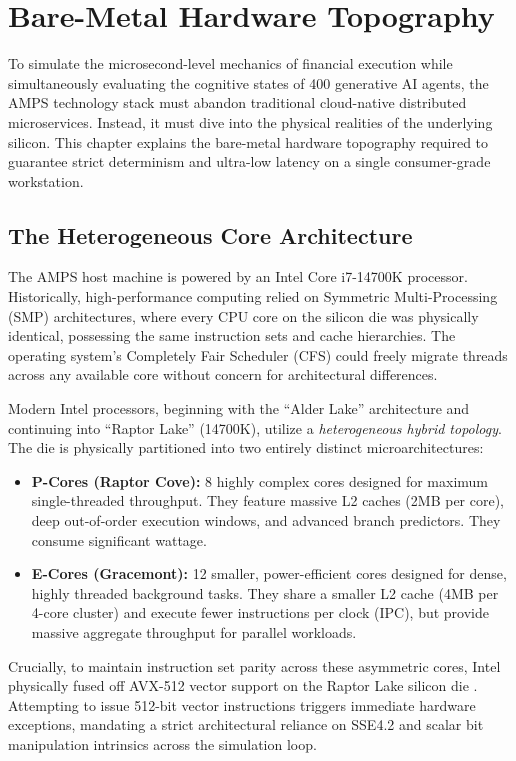 \chapter{Bare-Metal Hardware Topography}
\label{ch:hardware_topography}

To simulate the microsecond-level mechanics of financial execution while simultaneously evaluating the cognitive states of 400 generative AI agents, the AMPS technology stack must abandon traditional cloud-native distributed microservices. Instead, it must dive into the physical realities of the underlying silicon. This chapter explains the bare-metal hardware topography required to guarantee strict determinism and ultra-low latency on a single consumer-grade workstation.

\section{The Heterogeneous Core Architecture}

The AMPS host machine is powered by an Intel Core i7-14700K processor. Historically, high-performance computing relied on Symmetric Multi-Processing (SMP) architectures, where every CPU core on the silicon die was physically identical, possessing the same instruction sets and cache hierarchies. The operating system's Completely Fair Scheduler (CFS) could freely migrate threads across any available core without concern for architectural differences.

Modern Intel processors, beginning with the ``Alder Lake'' architecture and continuing into ``Raptor Lake'' (14700K), utilize a \textit{heterogeneous hybrid topology}. The die is physically partitioned into two entirely distinct microarchitectures:
\begin{itemize}
    \item \textbf{P-Cores (Raptor Cove):} 8 highly complex cores designed for maximum single-threaded throughput. They feature massive L2 caches (2MB per core), deep out-of-order execution windows, and advanced branch predictors. They consume significant wattage.
    \item \textbf{E-Cores (Gracemont):} 12 smaller, power-efficient cores designed for dense, highly threaded background tasks. They share a smaller L2 cache (4MB per 4-core cluster) and execute fewer instructions per clock (IPC), but provide massive aggregate throughput for parallel workloads.
\end{itemize}

Crucially, to maintain instruction set parity across these asymmetric cores, Intel physically fused off AVX-512 vector support on the Raptor Lake silicon die \cite{intel2024optimization}. Attempting to issue 512-bit vector instructions triggers immediate hardware exceptions, mandating a strict architectural reliance on SSE4.2 and scalar bit manipulation intrinsics across the simulation loop.

